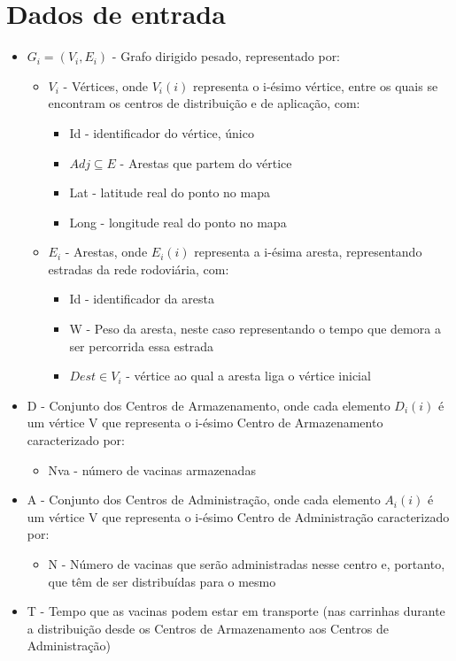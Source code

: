 \documentclass[12pt,a4paper]{report}
\begin{document}
	\section{Dados de entrada}
	\begin{itemize}
		\item \( G_i = (V_i, E_i) \) - Grafo dirigido pesado, representado por:
		\begin{itemize}
			\item \( V_i \) - Vértices, onde \( V_i(i) \) representa o i-ésimo vértice, entre os quais se encontram os centros de distribuição e de aplicação, com:
			\begin{itemize}
				\item Id - identificador do vértice, único
				\item \( Adj \subseteq E \) - Arestas que partem do vértice
				\item Lat - latitude real do ponto no mapa
				\item Long - longitude real do ponto no mapa
			\end{itemize}

			\item \( E_i \) - Arestas, onde \( E_i(i) \) representa a i-ésima aresta, representando estradas da rede rodoviária, com:
			\begin{itemize}
				\item Id - identificador da aresta
				\item W - Peso da aresta, neste caso representando o tempo que demora a ser percorrida essa estrada
				\item \( Dest \in V_i \) - vértice ao qual a aresta liga o vértice inicial
			\end{itemize}
		\end{itemize}

		\item D - Conjunto dos Centros de Armazenamento, onde cada elemento \( D_i(i) \) é um vértice V que representa o i-ésimo Centro de Armazenamento caracterizado por:
		\begin{itemize}
			\item Nva - número de vacinas armazenadas
		\end{itemize}
		
		\item A - Conjunto dos Centros de Administração, onde cada elemento \( A_i(i) \) é um vértice V que representa o i-ésimo Centro de Administração caracterizado por:
		\begin{itemize}
			\item N - Número de vacinas que serão administradas nesse centro e, portanto, que têm de ser distribuídas para o mesmo
		\end{itemize}

		\item T - Tempo que as vacinas podem estar em transporte (nas carrinhas durante a distribuição desde os Centros de Armazenamento aos Centros de Administração) 

	\end{itemize}
\end{document}
